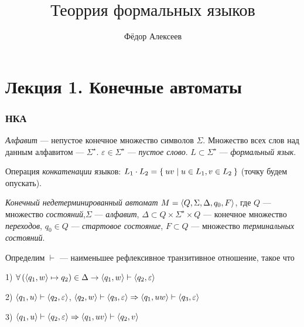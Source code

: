 

\newenvironment{lyxcode}
{\par\begin{list}{}{
\setlength{\rightmargin}{\leftmargin}
\setlength{\listparindent}{0pt}%
\raggedright
\setlength{\itemsep}{0pt}
\setlength{\parsep}{0pt}
\normalfont\ttfamily}%
 \item[]}
{\end{list}}



\title{$\mbox{Теоррия формальных языков}$}
\author{Фёдор Алексеев}

\maketitle
\gitlink\tableofcontents\newpage{}

\part*{Лекция 1. Конечные автоматы}

\section{НКА}
\begin{define*}
\emph{Алфавит} --- непустое конечное множество символов $\Sigma$.
Множество всех слов над данным алфавитом --- $\Sigma^{\star}$.
$\varepsilon\in\Sigma^{\star}$ --- \emph{пустое слово}. $L\subset\Sigma^{\star}$
--- \emph{формальный язык}.

Операция \emph{конкатенации} языков: $L_{1}\cdot L_{2}=\Set{ uv|u\in L_{1},v\in L_{2}} $
(точку будем опускать).
\end{define*}

\begin{define*}
\emph{Конечный недетерминированный автомат }$M=\Braket{ Q,\Sigma,\Delta,q_{0},F} $,
где $Q$ --- множество \emph{состояний},$\Sigma$ --- \emph{алфавит},
$\Delta\subset Q\times\Sigma^{\star}\times Q$ --- конечное множество
\emph{переходов}, $q_{0}\in Q$ --- \emph{стартовое состояние}, $F\subset Q$
--- множество \emph{терминальных состояний}.
\end{define*}

\begin{define*}
Определим $\vdash$ --- наименьшее рефлексивное транзитивное отношение,
такое что

1) $\forall\left(\Braket{ q_{1},w} \mapsto q_{2}\right)\in\Delta\rightarrow\Braket{ q_{1},w} \vdash\Braket{ q_{2},\varepsilon} $

2) $\Braket{ q_{1},u} \vdash\Braket{ q_{2},\varepsilon} $,
$\Braket{ q_{2},w} \vdash\Braket{ q_{3},\varepsilon} \Rightarrow\Braket{ q_{1},uw} \vdash\Braket{ q_{3},\varepsilon} $

3) $\Braket{ q_{1},u} \vdash\Braket{ q_{2},\varepsilon} \Rightarrow\Braket{ q_{1},uv} \vdash\Braket{ q_{2},v} $
\end{define*}

